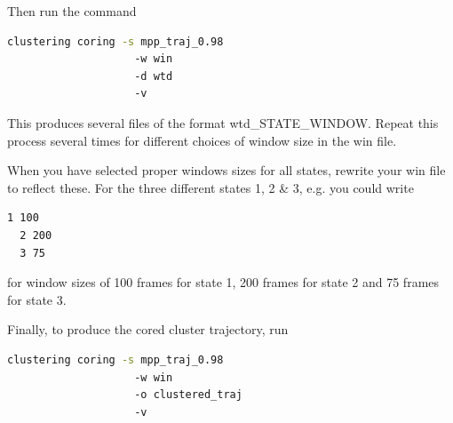 \documentclass[12pt,a4paper,twoside,english,fleqn]{article}
\begin{document}
Then run the command
\begin{lstlisting}[language=bash,basicstyle=\ttfamily]
  clustering coring -s mpp_traj_0.98
                    -w win
                    -d wtd
                    -v
\end{lstlisting}

This produces several files of the format {\ttfamily wtd\_STATE\_WINDOW}.
Repeat this process several times for different choices of window size in the
{\ttfamily win} file.

When you have selected proper windows sizes for all states, rewrite your
{\ttfamily win} file to reflect these. For the three different states 1, 2
\& 3, e.g. you could write
\begin{lstlisting}[basicstyle=\ttfamily]
  1 100
  2 200
  3 75
\end{lstlisting}
for window sizes of 100 frames for state 1, 200 frames for state 2 and 75
frames for state 3.

Finally, to produce the cored cluster trajectory, run
\begin{lstlisting}[language=bash,basicstyle=\ttfamily]
  clustering coring -s mpp_traj_0.98
                    -w win
                    -o clustered_traj
                    -v
\end{lstlisting}



\end{document}
